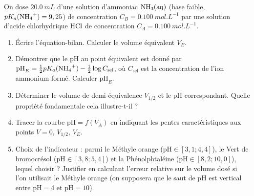 \documentclass[11pt]{article}
\begin{document}
\begin{exercice}
On dose $\SI{20,0}{mL}$ d'une solution d'ammoniac $\ce{NH3(aq)}$ (base faible, $pK_a(\ce{NH4+}) = 9,25$) de concentration $C_B = \SI{0,100}{mol.L^{-1}}$ par une solution d'acide chlorhydrique $\ce{HCl}$ de concentration $C_A = \SI{0,100}{mol.L^{-1}}$.
\begin{enumerate}
    \item Écrire l'équation-bilan. Calculer le volume équivalent $V_E$.
    \item Démontrer que le pH au point équivalent est donné par $\text{pH}_E = \frac{1}{2}pK_a(\ce{NH4+}) - \frac{1}{2}\log C_{\text{sel}}$, où $C_{\text{sel}}$ est la concentration de l'ion ammonium formé. Calculer $\text{pH}_E$.
    \item Déterminer le volume de demi-équivalence $V_{1/2}$ et le pH correspondant. Quelle propriété fondamentale cela illustre-t-il ?
    \item Tracer la courbe $\text{pH} = f(V_A)$ en indiquant les pentes caractéristiques aux points $V=0$, $V_{1/2}$, $V_E$.
    \item Choix de l'indicateur : parmi le Méthyle orange ($\text{pH} \in [3,1; 4,4]$), le Vert de bromocrésol ($\text{pH} \in [3,8; 5,4]$) et la Phénolphtaléine ($\text{pH} \in [8,2; 10,0]$), lequel choisir ? Justifier en calculant l'erreur relative sur le volume dosé si l'on utilisait le Méthyle orange (on supposera que le saut de pH est vertical entre $\text{pH}=4$ et $\text{pH}=10$).
\end{enumerate}
\end{exercice}
\end{document}
